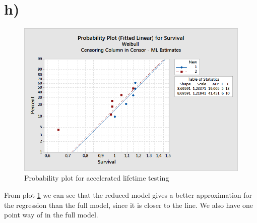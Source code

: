 \documentclass[10pt, a4paper]{article}
\begin{document}
\section*{h)}

\begin{figure}[h!]
\centering
\includegraphics[scale=0.75]{siste.png}
\caption{Probability plot for accelerated lifetime testing}
\label{siste}
\end{figure}
From plot \ref{siste} we can see that the reduced model gives a better approximation for the regression than the full model, since it is closer to the line. We also have one point way of in the full model.
\end{document}

